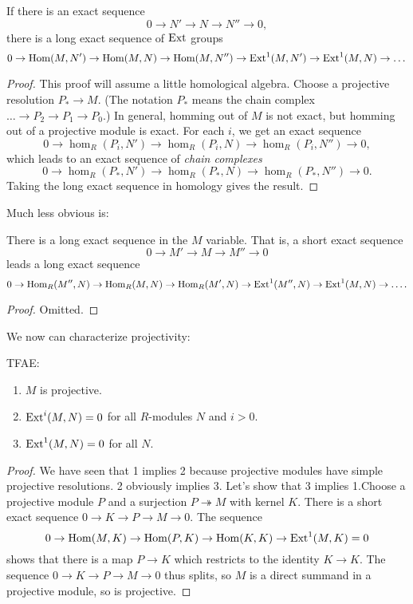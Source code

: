 \begin{proposition} 
If there is an exact sequence
\[ 0 \to N' \to N \to N'' \to 0,  \]
there is a long exact sequence of $\mathrm{Ext}$ groups
\[ 0 \to \operatorname{Hom}(M,N') \to \operatorname{Hom}(M,N) \to \operatorname{Hom}(M,N'') \to
\mathrm{Ext}^1(M,N') \to
\mathrm{Ext}^1(M,N) \to \dots  \]
\end{proposition} 
\begin{proof} 
This proof will assume a little homological algebra. Choose a
projective
resolution $P_* \to M$. (The notation $P_*$ means the chain
complex $\dots \to
P_2 \to P_1 \to P_0$.) In general, homming out of $M$ is not
exact, but homming
out of a projective module is exact. For each $i$, we get an
exact sequence
\[ 0 \to \hom_R(P_i, N') \to \hom_R(P_i, N) \to \hom_R(P_i,
N'')\to 0, \]
which leads to an exact sequence of \emph{chain complexes}
\[ 0 \to \hom_R(P_*,N') \to \hom_R(P_*,N) \to \hom_R(P_*,N'')
\to 0 . \]
Taking the long exact sequence in homology gives the result.
\end{proof} 


Much less obvious is:

\begin{proposition} 
There is a long exact sequence in the $M$ variable. That is, a
short exact
sequence
\[ 0 \to M' \to M \to M'' \to 0  \]
leads a long exact sequence
\[ 0 \to \operatorname{Hom}_R(M'', N) \to \operatorname{Hom}_R(M,N) \to \operatorname{Hom}_R(M', N) \to
\mathrm{Ext}^1(M'', N)
\to \mathrm{Ext}^1(M, N) \to \dots.  \]
\end{proposition} 
\begin{proof} 
Omitted.
\end{proof} 

We now can characterize projectivity:
\begin{corollary} 
TFAE:
\begin{enumerate}
\item $M$ is projective. 
\item $\mathrm{Ext}^i(M,N) = 0$ for all $R$-modules $N$ and $i>0$.
\item  $\mathrm{Ext}^1(M,N)=0$ for all $N$.
\end{enumerate}
\end{corollary} 
\begin{proof} 
We have seen that 1 implies 2 because projective modules have
simple projective
resolutions. 2 obviously implies 3. Let's show that 3 implies
1.Choose a
projective module $P$ and a surjection $P \twoheadrightarrow M$
with kernel
$K$. There is a short exact sequence $0 \to K \to P \to M \to
0$. The sequence
\[ 0 \to \operatorname{Hom}(M,K) \to \operatorname{Hom}(P,K) \to \operatorname{Hom}(K,K) \to
\mathrm{Ext}^1(M,K)=0\]
shows that there is a map $P \to K$ which restricts to the
identity $K \to K$.
The sequence $0 \to K \to P \to M \to 0$ thus splits, so $M$ is
a direct
summand in a projective module, so is projective.
\end{proof} 

